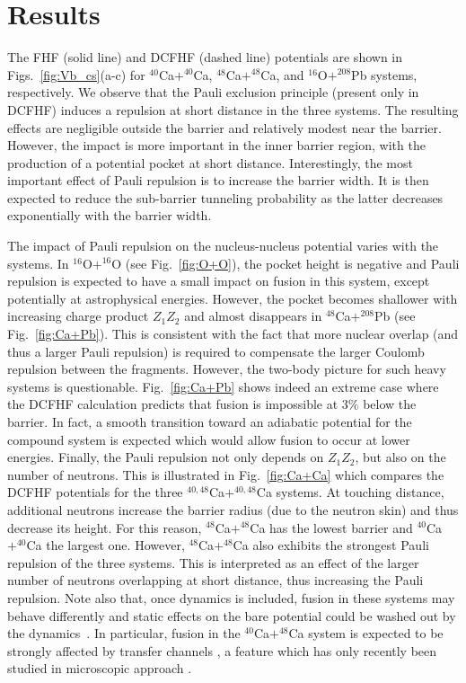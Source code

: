 \section{Results}

The FHF (solid line) and DCFHF (dashed line) potentials are shown in Figs.~\ref{fig:Vb_cs}(a-c)
for $^{40}$Ca$+^{40}$Ca,   $^{48}$Ca$+^{48}$Ca, and $^{16}$O$+^{208}$Pb systems, respectively.
We observe that the Pauli exclusion principle (present only in DCFHF) induces a repulsion at short distance in the three systems.
The resulting effects are negligible outside the barrier and relatively modest near the barrier.
However, the impact is  more important in the inner barrier region, 
with the production of a potential pocket at short distance.
Interestingly, the most important effect of Pauli repulsion is to increase the barrier width. 
It is then expected to reduce the sub-barrier tunneling probability as the latter 
decreases exponentially with the barrier width.

The impact of Pauli repulsion  on the  nucleus-nucleus potential varies with the systems. 
In $^{16}$O$+^{16}$O (see Fig.~\ref{fig:O+O}), 
the pocket height is negative and Pauli repulsion is expected to have a small impact on fusion 
in this system, except potentially at astrophysical energies. 
However, the pocket becomes shallower with increasing charge product $Z_1Z_2$ 
and almost disappears in $^{48}$Ca+$^{208}$Pb (see Fig.~\ref{fig:Ca+Pb}). 
This is consistent with the fact that more nuclear overlap (and thus a larger Pauli repulsion) 
is required to compensate the larger Coulomb repulsion between the fragments. 
However, the two-body  picture for such heavy systems is questionable. 
Fig.~\ref{fig:Ca+Pb}  shows indeed an extreme case where the DCFHF calculation predicts that fusion is impossible at $3\%$ below the barrier. 
In fact, a smooth transition toward an adiabatic potential for the compound system is expected \citep{ichikawa2009b} which would allow fusion to occur at lower energies. 
Finally, the Pauli repulsion not only depends on $Z_1Z_2$, but also on the number of neutrons. 
This is illustrated in Fig.~\ref{fig:Ca+Ca} which compares the DCFHF potentials for the three $^{40,48}$Ca$+^{40,48}$Ca systems.
At touching distance, additional neutrons increase the barrier radius (due to the neutron skin) and thus decrease its height. 
For this reason, $^{48}$Ca$+^{48}$Ca has the lowest barrier and $^{40}$Ca$+^{40}$Ca the largest one. 
However, $^{48}$Ca$+^{48}$Ca also exhibits the strongest Pauli repulsion of the three systems. 
This is interpreted as an effect of the larger number of neutrons overlapping at short distance, thus increasing the Pauli repulsion. 
Note also that, once dynamics is included, fusion in these systems may behave differently and static effects on the bare potential could be washed out by the dynamics~\citep{vophuoc2016}. 
In particular, fusion in the $^{40}$Ca$+^{48}$Ca system is expected to be strongly affected by transfer channels \citep{jiang2010,montagnoli2012},  a feature which has only recently been studied in microscopic approach \citep{godbey2017}.

